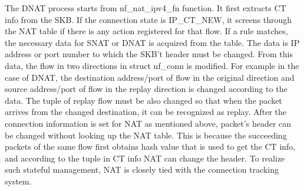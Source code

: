 The DNAT process starts from nf\_nat\_ipv4\_fn function. It first extracts CT info from the SKB. If the connection state is IP\_CT\_NEW, it screens through the NAT table if there is any action registered for that flow. If a rule matches, the necessary data for SNAT or DNAT is acquired from the table. The data is IP address or port number to which the SKB't header must be changed. From this data, the flow in two directions in struct nf\_conn is modified. For example in the case of DNAT, the destination address/port of flow in the original direction and source address/port of flow in the replay direction is changed according to the data. The tuple of replay flow  must be also changed so that when the packet arrives from the changed destination, it can be recognized as replay. After the connection information is set for NAT as mentioned above, packet's header can be changed without looking up the NAT table. This is because the succeeding packets of the same flow first obtains hash value that is used to get the CT info, and according to the tuple in CT info NAT can change the header. To realize such stateful management, NAT is closely tied with the connection tracking system. 



















